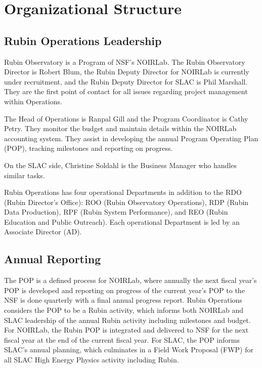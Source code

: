\section{Organizational Structure}
\label{sec:structure}

\subsection{Rubin \gls{Operations} Leadership}
\label{sec:contacts}

Rubin Observatory is a Program of \gls{NSF}'s \gls{NOIRLab}.
The Rubin Observatory \gls{Director} is Robert Blum, the Rubin Deputy \gls{Director} for \gls{NOIRLab} is currently under recruitment, and the Rubin Deputy \gls{Director} for \gls{SLAC} is Phil Marshall.
They are the first point of contact for all issues regarding project management within \RO \gls{Operations}.

The Head of \gls{Operations} is Ranpal Gill and the Program Coordinator is Cathy Petry.
They monitor the budget and maintain details within the \gls{NOIRLab} accounting system.
They assist in developing the annual Program Operating Plan (\gls{POP}), tracking milestones and reporting on progress.

On the \gls{SLAC} side, Christine Soldahl is the \gls{Business Manager} who handles similar tasks.

Rubin Operations has four operational Departments in addition to the RDO (Rubin Director’s Office): \gls{ROO} (Rubin Observatory Operations), \gls{RDP} (Rubin Data Production), \gls{RPF} (Rubin System Performance), and REO (Rubin Education and Public Outreach).
Each operational Department is led by an Associate \gls{Director} (\gls{AD}).

\subsection{Annual Reporting}
\label{sec:reporting}

The \gls{POP} is a defined process for \gls{NOIRLab}, where annually the next fiscal year's \gls{POP} is developed and reporting on progress of the current year's \gls{POP} to the \gls{NSF} is done quarterly with a final annual progress report.
Rubin Operations considers the \gls{POP} to be a Rubin activity, which informs both \gls{NOIRLab} and \gls{SLAC} leadership of the annual Rubin activity including milestones and budget.
For \gls{NOIRLab}, the Rubin \gls{POP} is integrated and delivered to \gls{NSF} for the next fiscal year at the end of the current fiscal year.
For \gls{SLAC}, the \gls{POP} informs \gls{SLAC}'s annual planning, which culminates in a Field Work Proposal (\gls{FWP}) for all \gls{SLAC} High Energy Physics activity including Rubin.

